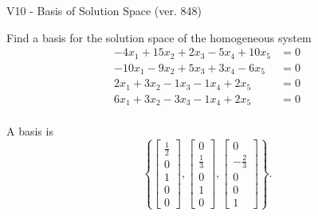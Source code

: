 \begin{exercise}
  \begin{exerciseTitle}V10 - Basis of Solution Space (ver. 848)\end{exerciseTitle}
  \begin{exerciseStatement}
    Find a basis for the solution space of the homogeneous system 
\begin{align*}
 -4 x_ 1 + 15 x_ 2 + 2 x_ 3 -5 x_ 4 + 10 x_ 5 &= 0  \\ 
  -10 x_ 1 -9 x_ 2 + 5 x_ 3 + 3 x_ 4 -6 x_ 5 &= 0  \\ 
  2 x_ 1 + 3 x_ 2 -1 x_ 3 -1 x_ 4 + 2 x_ 5 &= 0  \\ 
  6 x_ 1 + 3 x_ 2 -3 x_ 3 -1 x_ 4 + 2 x_ 5 &= 0  \\ 
 \end{align*}


 
  \end{exerciseStatement}

  \begin{exerciseAnswer}
   A basis is   
\[\left\{\left[\begin{array}{c}
\frac{1}{2} \\
0 \\
1 \\
0 \\
0
\end{array}\right] , \left[\begin{array}{c}
0 \\
\frac{1}{3} \\
0 \\
1 \\
0
\end{array}\right] , \left[\begin{array}{c}
0 \\
-\frac{2}{3} \\
0 \\
0 \\
1
\end{array}\right]\right\}.\]

  


  \end{exerciseAnswer}
\end{exercise}